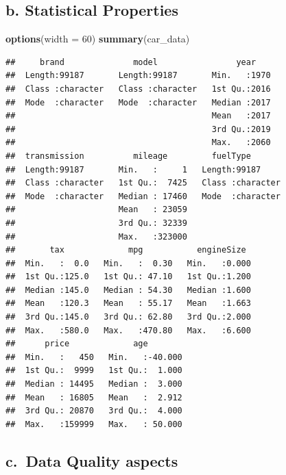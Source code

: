 \documentclass[sigchi]{acmart}
\newenvironment{Shaded}{\begin{snugshade}}{\end{snugshade}}
\newcommand{\DataTypeTok}[1]{\textcolor[rgb]{0.13,0.29,0.53}{#1}}
\newcommand{\DecValTok}[1]{\textcolor[rgb]{0.00,0.00,0.81}{#1}}
\newcommand{\KeywordTok}[1]{\textcolor[rgb]{0.13,0.29,0.53}{\textbf{#1}}}
\newcommand{\NormalTok}[1]{#1}
\begin{document}
\hypertarget{b.-statistical-properties}{%
\subsection{b. Statistical Properties}\label{b.-statistical-properties}}

\begin{Shaded}
\begin{Highlighting}[]
\KeywordTok{options}\NormalTok{(}\DataTypeTok{width =} \DecValTok{60}\NormalTok{)}
\KeywordTok{summary}\NormalTok{(car_data)}
\end{Highlighting}
\end{Shaded}

\begin{verbatim}
##     brand              model                year     
##  Length:99187       Length:99187       Min.   :1970  
##  Class :character   Class :character   1st Qu.:2016  
##  Mode  :character   Mode  :character   Median :2017  
##                                        Mean   :2017  
##                                        3rd Qu.:2019  
##                                        Max.   :2060  
##  transmission          mileage         fuelType        
##  Length:99187       Min.   :     1   Length:99187      
##  Class :character   1st Qu.:  7425   Class :character  
##  Mode  :character   Median : 17460   Mode  :character  
##                     Mean   : 23059                     
##                     3rd Qu.: 32339                     
##                     Max.   :323000                     
##       tax             mpg           engineSize   
##  Min.   :  0.0   Min.   :  0.30   Min.   :0.000  
##  1st Qu.:125.0   1st Qu.: 47.10   1st Qu.:1.200  
##  Median :145.0   Median : 54.30   Median :1.600  
##  Mean   :120.3   Mean   : 55.17   Mean   :1.663  
##  3rd Qu.:145.0   3rd Qu.: 62.80   3rd Qu.:2.000  
##  Max.   :580.0   Max.   :470.80   Max.   :6.600  
##      price             age         
##  Min.   :   450   Min.   :-40.000  
##  1st Qu.:  9999   1st Qu.:  1.000  
##  Median : 14495   Median :  3.000  
##  Mean   : 16805   Mean   :  2.912  
##  3rd Qu.: 20870   3rd Qu.:  4.000  
##  Max.   :159999   Max.   : 50.000
\end{verbatim}

\hypertarget{c.-data-quality-aspects}{%
\subsection{c.~Data Quality aspects}\label{c.-data-quality-aspects}}
\end{document}
